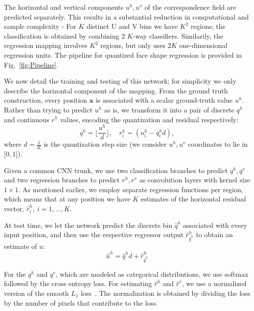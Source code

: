 \documentclass[10pt,twocolumn,letterpaper]{article}
\begin{document}
		The horizontal and vertical components $u^h,u^v$ of the correspondence field are predicted separately. This results in a substantial reduction in computational and sample complexity -  For $K$ distinct U and V bins we have $K^2$ regions; the classification is obtained by combining 2 $K$-way classifiers. Similarily, the regression mapping involves $K^2$ regions, but only uses $2 K$ one-dimensional regression units. The pipeline for quantized face shape regression is provided in Fig.~\ref{fig:Pipeline}. 


	We now detail the training and testing of this network;  for simplicity we only describe the horizontal component of the mapping. 
	From the ground truth construction, every position $\bm{x}$ is associated with a scalar ground-truth value $u^h$. Rather than trying to predict $u^h$ as is, we transform it into a pair of discrete $q^h$ and continuous $r^h$ values, encoding the quantization and residual respectively:
	\begin{equation} 
	q^h =  \lfloor {\frac{u^h}{d}} \rfloor, \quad  r_i^h =   \left(u^h_i - q^h_i d  \right),
	\end{equation}
	where $d = \frac{1}{K}$ is the quantization step size (we consider $u^h,u^v$ coordinates to lie in $[0,1$]).
	
	Given a common CNN trunk, we use two classification branches to predict $q^h, q^v$ and two regression branches to predict $r^h,r^v$ as convolution layers with kernel size $1\times1$. As mentioned earlier, we employ separate regression functions per region, which means that at any position we have $K$ estimates of the horizontal residual vector, $\hat{r}^h_{i},~i=1,\ldots,K$.
	
	At test time, we let the network predict the discrete bin $\hat{q}^h$ associated with every input position, and then use the respective regressor output $\hat{r}^h_{\hat{q}^h}$ to obtain an estimate of $u$:
	\begin{equation}   
	\hat{u}^h =  \hat{q}^h d + \hat{r}^h_{\hat{q}^h}
	\end{equation}

For the $q^h$ and $q^v$, which are modeled as categorical distributions,  we use  softmax followed by the cross entropy loss. For estimating $\hat{r}^h$ and $\hat{r}^v$, we use a normalized version of the smooth $L_1$ loss~\cite{girshick2015fast}. The normalization is obtained by dividing the loss by the number of pixels that contribute to the loss.
\end{document}
